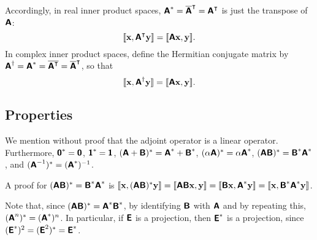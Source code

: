 Accordingly, in real inner product spaces,
$\textsf{\textbf{A}}^\ast= \overline{\textsf{\textbf{A}}}^\intercal  =  \textsf{\textbf{A}}^\intercal $ is just the transpose of $\textsf{\textbf{A}}$:
\begin{equation}
\llbracket {\bf x},\textsf{\textbf{A}}^\intercal {\bf y}\rrbracket =
\llbracket \textsf{\textbf{A}}{\bf x},{\bf y}\rrbracket .
\end{equation}
In complex inner product spaces,
define the Hermitian conjugate matrix by
$\textsf{\textbf{\textsf{\textbf{A}}}}^\dagger = \textsf{\textbf{A}}^\ast =\overline{\textsf{\textbf{A}}^\intercal } = \overline{\textsf{\textbf{A}}}^\intercal $, so that
\begin{equation}
\llbracket {\bf x},\textsf{\textbf{A}}^\dagger{\bf y}\rrbracket =
\llbracket \textsf{\textbf{A}}{\bf x},{\bf y}\rrbracket .
\end{equation}


\subsection{Properties}
We mention without proof that the adjoint operator is a linear operator.
Furthermore,
$\textsf{\textbf{0}}^\ast = \textsf{\textbf{0}}$,
$\textsf{\textbf{1}}^\ast = \textsf{\textbf{1}}$,
$(\textsf{\textbf{A}}+\textsf{\textbf{B}})^\ast = \textsf{\textbf{A}}^\ast+\textsf{\textbf{B}}^\ast$,
$(\alpha \textsf{\textbf{A}})^\ast = \alpha \textsf{\textbf{A}}^\ast$,
$( \textsf{\textbf{A}}\textsf{\textbf{B}})^\ast =   \textsf{\textbf{B}}^\ast
 \textsf{\textbf{A}}^\ast$,
and
$( \textsf{\textbf{A}}^{-1})^\ast
=
( \textsf{\textbf{A}}^\ast )^{-1}
$.

{\color{OliveGreen}\bproof
A proof for
$( \textsf{\textbf{A}}\textsf{\textbf{B}})^\ast =   \textsf{\textbf{B}}^\ast  \textsf{\textbf{A}}^\ast
$
is
$
\llbracket {\bf x},(\textsf{\textbf{A}}\textsf{\textbf{B}})^\ast {\bf y}\rrbracket
=
\llbracket \textsf{\textbf{A}}\textsf{\textbf{B}}{\bf x}, {\bf y}\rrbracket
=
\llbracket \textsf{\textbf{B}}{\bf x}, \textsf{\textbf{A}}^\ast{\bf y}\rrbracket
=
\llbracket {\bf x}, \textsf{\textbf{B}}^\ast\textsf{\textbf{A}}^\ast{\bf y}\rrbracket
$.
\eproof
}

Note that, since
$
( \textsf{\textbf{A}}\textsf{\textbf{B}})^\ast = \textsf{\textbf{A}}^\ast   \textsf{\textbf{B}}^\ast
$, by identifying $\textsf{\textbf{B}}$ with $\textsf{\textbf{A}}$  and by repeating this,
$( \textsf{\textbf{A}}^n)^\ast =  (\textsf{\textbf{A}}^\ast)^n$.
In particular, if
$\textsf{\textbf{E}}$
is a projection,
then
$\textsf{\textbf{E}}^\ast$ is a projection, since
$ (\textsf{\textbf{E}}^\ast)^2 =  ( \textsf{\textbf{E}}^2)^\ast  =\textsf{\textbf{E}}^\ast$.

